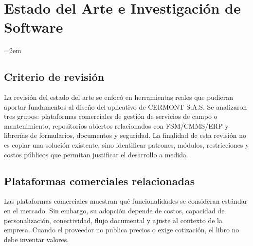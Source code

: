 
\chapter{Estado del Arte e Investigación de Software}
\label{ch:estado-arte}

\setlength{\parindent}{0pt}
\setlength{\parskip}{6pt}
\sloppy
\emergencystretch=2em
\raggedbottom
\section{Criterio de revisión}

La revisión del estado del arte se enfocó en herramientas reales que pudieran aportar fundamentos al diseño del aplicativo de CERMONT S.A.S. Se analizaron tres grupos: plataformas comerciales de gestión de servicios de campo o mantenimiento, repositorios abiertos relacionados con FSM/CMMS/ERP y librerías de formularios, documentos y seguridad. La finalidad de esta revisión no es copiar una solución existente, sino identificar patrones, módulos, restricciones y costos públicos que permitan justificar el desarrollo a medida.

\section{Plataformas comerciales relacionadas}

Las plataformas comerciales muestran qué funcionalidades se consideran estándar en el mercado. Sin embargo, su adopción depende de costos, capacidad de personalización, conectividad, flujo documental y ajuste al contexto de la empresa. Cuando el proveedor no publica precios o exige cotización, el libro no debe inventar valores.

